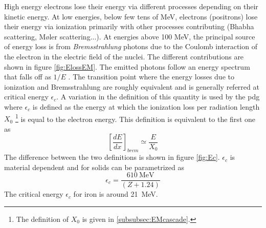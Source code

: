 High energy electrons lose their energy via different processes depending on their kinetic energy. At low energies, below few tens of MeV, electrons (positrons) lose their energy via ionization primarily with other processes contributing (Bhabha scattering, M\o{}ler scattering...). At energies above 100 MeV, the principal source of energy loss is from \textit{Bremsstrahlung} photons due to the Coulomb interaction of the electron in the electric field of the nuclei. The different contributions are shown in figure \ref{fig:ElossEM}. The emitted photons follow an energy spectrum that falls off as $1/E$ \cite{Wigmans:392793}. The transition point where the energy losses due to ionization and Bremsstrahlung are roughly equivalent and is generally referred at critical energy $\epsilon_{c}$. A variation in the definition of this quantity is used by the \acrshort{pdg} where $\epsilon_{c}$ is defined as the energy at which the ionization loss per radiation length $X_0$ \footnote{The definition of $X_0$ is given in \ref{subsubsec:EMcascade}.} is equal to the electron energy. This definition is equivalent to the first one as
\begin{equation}
  \left[\frac{dE}{dx}\right]_{brem} \simeq \frac{E}{X_0}
\end{equation}
The difference between the two definitions is shown in figure \ref{fig:Ec}. $\epsilon_{c}$ is material dependent and for solids can be parametrized as
\begin{equation}
  \epsilon_{c} = \frac{\SI{610}{\mega\eV}}{(Z + 1.24)}
\end{equation}
The critical energy $\epsilon_{c}$ for iron is around \SI{21}{\mega\eV}.

